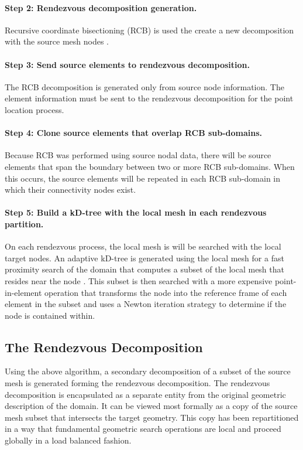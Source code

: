 \documentclass[letterpaper,12pt]{article}
\begin{document}
\paragraph{Step 2: Rendezvous decomposition generation.}
Recursive coordinate bisectioning (RCB) is used the create a new
decomposition with the source mesh nodes \cite{Berger_1987}.

\paragraph{Step 3: Send source elements to rendezvous decomposition.}
The RCB decomposition is generated only from source node
information. The element information must be sent to the rendezvous
decomposition for the point location process. 

\paragraph{Step 4: Clone source elements that overlap RCB
  sub-domains.}  Because RCB was performed using source nodal data,
there will be source elements that span the boundary between two or
more RCB sub-domains. When this occurs, the source elements will be
repeated in each RCB sub-domain in which their connectivity nodes
exist. 

\paragraph{Step 5: Build a kD-tree with the local mesh in each rendezvous
  partition.}  On each rendezvous process, the local mesh is will be
searched with the local target nodes. An adaptive kD-tree is generated
using the local mesh for a fast proximity search of the domain that
computes a subset of the local mesh that resides near the node
\cite{Bentley_1975}. This subset is then searched with a more
expensive point-in-element operation that transforms the node into the
reference frame of each element in the subset and uses a Newton
iteration strategy to determine if the node is contained within.

\subsection{The Rendezvous Decomposition}\label{subsec:rendezvous_decomp}
Using the above algorithm, a secondary decomposition of a subset of
the source mesh is generated forming the rendezvous decomposition. The
rendezvous decomposition is encapsulated as a separate entity from the
original geometric description of the domain. It can be viewed most
formally as a copy of the source mesh subset that intersects the
target geometry. This copy has been repartitioned in a way that
fundamental geometric search operations are local and proceed globally
in a load balanced fashion.
\end{document}
